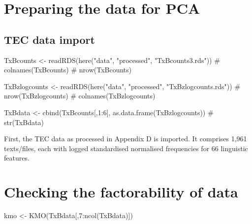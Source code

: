 \documentclass[
  letterpaper,
  DIV=11,
  numbers=noendperiod]{scrreprt}
\newenvironment{Shaded}{\begin{snugshade}}{\end{snugshade}}
\newcommand{\CommentTok}[1]{\textcolor[rgb]{0.37,0.37,0.37}{#1}}
\newcommand{\DecValTok}[1]{\textcolor[rgb]{0.68,0.00,0.00}{#1}}
\newcommand{\FunctionTok}[1]{\textcolor[rgb]{0.28,0.35,0.67}{#1}}
\newcommand{\NormalTok}[1]{\textcolor[rgb]{0.00,0.23,0.31}{#1}}
\newcommand{\OtherTok}[1]{\textcolor[rgb]{0.00,0.23,0.31}{#1}}
\newcommand{\SpecialCharTok}[1]{\textcolor[rgb]{0.37,0.37,0.37}{#1}}
\newcommand{\StringTok}[1]{\textcolor[rgb]{0.13,0.47,0.30}{#1}}
\begin{document}
\section{Preparing the data for PCA}\label{preparing-the-data-for-pca}

\subsection{TEC data import}\label{tec-data-import}

\begin{Shaded}
\begin{Highlighting}[]
\NormalTok{TxBcounts }\OtherTok{\textless{}{-}} \FunctionTok{readRDS}\NormalTok{(}\FunctionTok{here}\NormalTok{(}\StringTok{"data"}\NormalTok{, }\StringTok{"processed"}\NormalTok{, }\StringTok{"TxBcounts3.rds"}\NormalTok{))}
\CommentTok{\# colnames(TxBcounts)}
\CommentTok{\# nrow(TxBcounts)}

\NormalTok{TxBzlogcounts }\OtherTok{\textless{}{-}} \FunctionTok{readRDS}\NormalTok{(}\FunctionTok{here}\NormalTok{(}\StringTok{"data"}\NormalTok{, }\StringTok{"processed"}\NormalTok{, }\StringTok{"TxBzlogcounts.rds"}\NormalTok{)) }
\CommentTok{\# nrow(TxBzlogcounts)}
\CommentTok{\# colnames(TxBzlogcounts)}

\NormalTok{TxBdata }\OtherTok{\textless{}{-}} \FunctionTok{cbind}\NormalTok{(TxBcounts[,}\DecValTok{1}\SpecialCharTok{:}\DecValTok{6}\NormalTok{], }\FunctionTok{as.data.frame}\NormalTok{(TxBzlogcounts))}
\CommentTok{\# str(TxBdata)}
\end{Highlighting}
\end{Shaded}

First, the TEC data as processed in Appendix D is imported. It comprises
1,961 texts/files, each with logged standardised normalised frequencies
for 66 linguistic features.

\section{Checking the factorability of
data}\label{checking-the-factorability-of-data}

\begin{Shaded}
\begin{Highlighting}[]
\NormalTok{kmo }\OtherTok{\textless{}{-}} \FunctionTok{KMO}\NormalTok{(TxBdata[,}\DecValTok{7}\SpecialCharTok{:}\FunctionTok{ncol}\NormalTok{(TxBdata)]) }
\end{Highlighting}
\end{Shaded}
\end{document}
